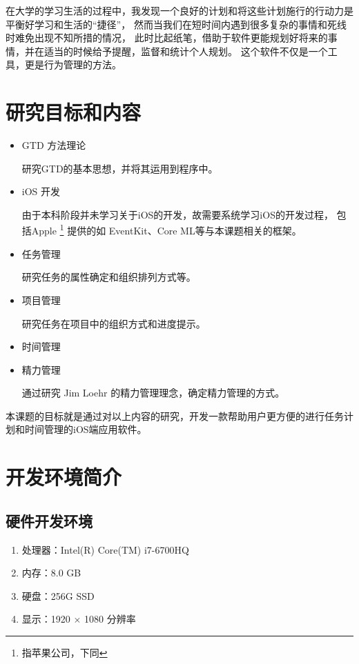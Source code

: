 在大学的学习生活的过程中，我发现一个良好的计划和将这些计划施行的行动力是平衡好学习和生活的“捷径”，
然而当我们在短时间内遇到很多复杂的事情和死线时难免出现不知所措的情况，
此时比起纸笔，借助于软件更能规划好将来的事情，并在适当的时候给予提醒，监督和统计个人规划。
这个软件不仅是一个工具，更是行为管理的方法。

\section{研究目标和内容}
\begin{itemize}
	\item GTD 方法理论
	
	研究GTD的基本思想，并将其运用到程序中。
	\item iOS 开发
	
	由于本科阶段并未学习关于iOS的开发，故需要系统学习iOS的开发过程，
	包括Apple \footnote{指苹果公司，下同} 提供的如 EventKit、Core ML等与本课题相关的框架。
	\item 任务管理
	
	研究任务的属性确定和组织排列方式等。
	\item 项目管理
	
	研究任务在项目中的组织方式和进度提示。
	\item 时间管理
	\item 精力管理
	
	通过研究 Jim Loehr 的精力管理理念，确定精力管理的方式。
	
\end{itemize}

本课题的目标就是通过对以上内容的研究，开发一款帮助用户更方便的进行任务计划和时间管理的iOS端应用软件。

\section{开发环境简介}

\subsection{硬件开发环境}

\begin{enumerate}
	\item 处理器：Intel(R) Core(TM) i7-6700HQ
	\item 内存：8.0 GB
	\item 硬盘：256G SSD
	\item 显示：1920 $\times$ 1080 分辨率
\end{enumerate}

